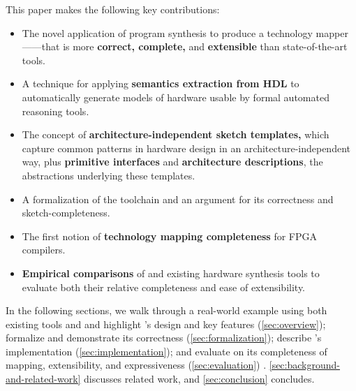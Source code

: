 This paper makes  
the following key contributions:
\begin{itemize}[leftmargin=*]
\item The novel application of program synthesis
  to produce a technology mapper---\lr---that is
  more \textbf{correct, complete,} and \textbf{extensible} than state-of-the-art 
  tools.
\item A technique for applying
  \textbf{semantics extraction from HDL}
  to automatically generate models
  of hardware usable by 
  formal automated reasoning tools.
\item The concept of 
  \textbf{architecture-independent sketch templates,}
  which capture common patterns in hardware design
  in an architecture-independent way,
  plus \textbf{primitive interfaces} and \textbf{architecture descriptions}, the abstractions
  underlying these templates.
\item A formalization of the \lr
  toolchain and an argument
  for its correctness and sketch-completeness.
\item The first notion of \textbf{technology
  mapping completeness} for FPGA
  compilers.
\item \textbf{Empirical comparisons }of
  \lr and existing hardware synthesis
  tools to evaluate both their
  relative completeness and
  ease of extensibility.


  



\end{itemize}

In the following sections, we walk through a real-world example
  using both existing tools
  and \lr
  and 
  highlight \lr's design and key features (\cref{sec:overview}); 
  formalize \lr and
  demonstrate its correctness (\cref{sec:formalization}); 
  describe \lr's implementation (\cref{sec:implementation}); and 
  evaluate \lr on its
  completeness of mapping,
  extensibility,
  and expressiveness (\cref{sec:evaluation}) .
\cref{sec:background-and-related-work}
  discusses related work, and
  \cref{sec:conclusion} concludes.